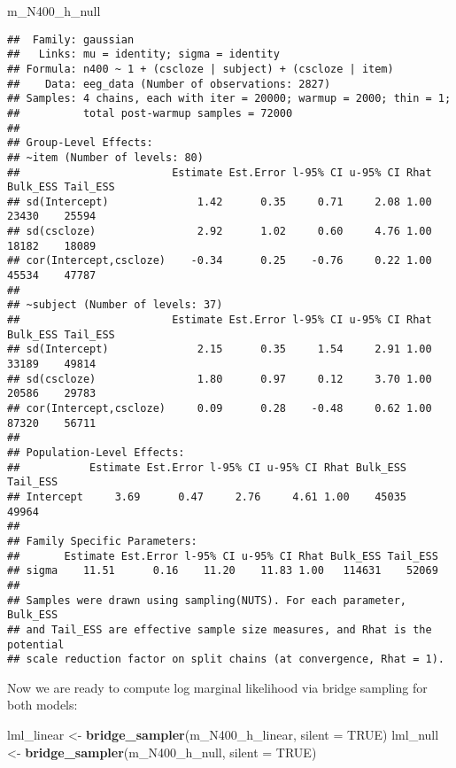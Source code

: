 \documentclass[12pt,ignorenonframetext,aspectratio=169]{beamer}
\newenvironment{Shaded}{\begin{snugshade}}{\end{snugshade}}
\newcommand{\DataTypeTok}[1]{\textcolor[rgb]{0.13,0.29,0.53}{#1}}
\newcommand{\KeywordTok}[1]{\textcolor[rgb]{0.13,0.29,0.53}{\textbf{#1}}}
\newcommand{\NormalTok}[1]{#1}
\newcommand{\OtherTok}[1]{\textcolor[rgb]{0.56,0.35,0.01}{#1}}
\newcommand{\StringTok}[1]{\textcolor[rgb]{0.31,0.60,0.02}{#1}}
\begin{document}
\begin{frame}[fragile]

\tiny

\begin{Shaded}
\begin{Highlighting}[]
\NormalTok{m_N400_h_null}
\end{Highlighting}
\end{Shaded}

\begin{verbatim}
##  Family: gaussian 
##   Links: mu = identity; sigma = identity 
## Formula: n400 ~ 1 + (cscloze | subject) + (cscloze | item) 
##    Data: eeg_data (Number of observations: 2827) 
## Samples: 4 chains, each with iter = 20000; warmup = 2000; thin = 1;
##          total post-warmup samples = 72000
## 
## Group-Level Effects: 
## ~item (Number of levels: 80) 
##                        Estimate Est.Error l-95% CI u-95% CI Rhat Bulk_ESS Tail_ESS
## sd(Intercept)              1.42      0.35     0.71     2.08 1.00    23430    25594
## sd(cscloze)                2.92      1.02     0.60     4.76 1.00    18182    18089
## cor(Intercept,cscloze)    -0.34      0.25    -0.76     0.22 1.00    45534    47787
## 
## ~subject (Number of levels: 37) 
##                        Estimate Est.Error l-95% CI u-95% CI Rhat Bulk_ESS Tail_ESS
## sd(Intercept)              2.15      0.35     1.54     2.91 1.00    33189    49814
## sd(cscloze)                1.80      0.97     0.12     3.70 1.00    20586    29783
## cor(Intercept,cscloze)     0.09      0.28    -0.48     0.62 1.00    87320    56711
## 
## Population-Level Effects: 
##           Estimate Est.Error l-95% CI u-95% CI Rhat Bulk_ESS Tail_ESS
## Intercept     3.69      0.47     2.76     4.61 1.00    45035    49964
## 
## Family Specific Parameters: 
##       Estimate Est.Error l-95% CI u-95% CI Rhat Bulk_ESS Tail_ESS
## sigma    11.51      0.16    11.20    11.83 1.00   114631    52069
## 
## Samples were drawn using sampling(NUTS). For each parameter, Bulk_ESS
## and Tail_ESS are effective sample size measures, and Rhat is the potential
## scale reduction factor on split chains (at convergence, Rhat = 1).
\end{verbatim}

\end{frame}

\begin{frame}[fragile]

Now we are ready to compute log marginal likelihood via bridge sampling for both models:
\footnotesize
\vspace{1cm}

\begin{Shaded}
\begin{Highlighting}[]
\NormalTok{lml_linear <-}\StringTok{ }\KeywordTok{bridge_sampler}\NormalTok{(m_N400_h_linear, }\DataTypeTok{silent =} \OtherTok{TRUE}\NormalTok{)}
\NormalTok{lml_null <-}\StringTok{ }\KeywordTok{bridge_sampler}\NormalTok{(m_N400_h_null, }\DataTypeTok{silent =} \OtherTok{TRUE}\NormalTok{)}
\end{Highlighting}
\end{Shaded}

\end{frame}
\end{document}
